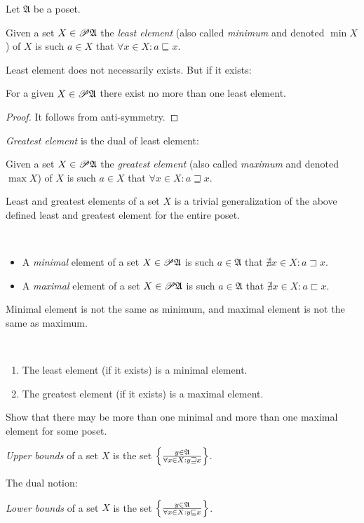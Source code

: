 Let $\mathfrak{A}$ be a poset.
\begin{defn}
Given a set $X\in\mathscr{P}\mathfrak{A}$ the
\emph{least element} (also called \emph{minimum} and denoted $\min X$)
of $X$ is such $a\in X$ that $\forall x\in X:a\sqsubseteq x$.
\end{defn}
Least element does not necessarily exists. But if it exists:
\begin{prop}
For a given $X\in\mathscr{P}\mathfrak{A}$ there exist no more than one
least element.\end{prop}
\begin{proof}
It follows from anti-symmetry.
\end{proof}
\emph{Greatest element} is the dual of least element:
\begin{defn}
Given a set $X\in\mathscr{P}\mathfrak{A}$ the
\emph{greatest element} (also called \emph{maximum} and denoted $\max X$)
of $X$ is such $a\in X$ that $\forall x\in X:a\sqsupseteq x$.\end{defn}
\begin{rem}
Least and greatest elements of a set $X$ is a trivial generalization
of the above defined least and greatest element for the entire poset.\end{rem}
\begin{defn}
~
\begin{itemize}
\item {}A \emph{minimal} element of a set $X\in\mathscr{P}\mathfrak{A}$
is such $a\in\mathfrak{A}$ that $\nexists x\in X:a\sqsupset x$.
\item {}A \emph{maximal} element of a set $X\in\mathscr{P}\mathfrak{A}$
is such $a\in\mathfrak{A}$ that $\nexists x\in X:a\sqsubset x$.
\end{itemize}
\end{defn}
\begin{rem}
Minimal element is not the same as minimum, and maximal element is
not the same as maximum.\end{rem}
\begin{obvious}
~
\begin{enumerate}
\item The least element (if it exists) is a minimal element.
\item The greatest element (if it exists) is a maximal element.
\end{enumerate}
\end{obvious}
\begin{xca}
Show that there may be more than one minimal and more than one maximal
element for some poset.\end{xca}
\begin{defn}
\emph{Upper bounds} of a set $X$ is the set
$\left\{ \frac{y\in\mathfrak{A}}{\forall x\in X:y\sqsupseteq x}\right\}$.
\end{defn}
The dual notion:
\begin{defn}
\emph{Lower bounds} of a set $X$ is the set
$\left\{ \frac{y\in\mathfrak{A}}{\forall x\in X:y\sqsubseteq x}\right\}$.
\end{defn}

